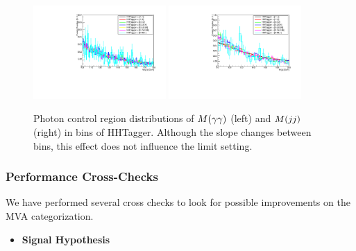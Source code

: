 
\begin{figure}[h]
  \centering
  \includegraphics[width=0.45\textwidth]{figures/sec-cats/mva/hhtag_mgg}\hfil
  \includegraphics[width=0.45\textwidth]{figures/sec-cats/mva/hhtag_mjj}\hfil
  \caption{Photon control region distributions of $M(\gamma\gamma)$ (left) and $M(jj)$ (right) in bins of HHTagger. Although the slope changes between bins, this effect does not influence the limit setting.}
  \label{fig:mva_mggmjj}
\end{figure}

\subsubsection{Performance Cross-Checks}

We have performed several cross checks to look for possible improvements on the MVA categorization. 

\begin{itemize}
\item \textbf{Signal Hypothesis}
\end{itemize}

